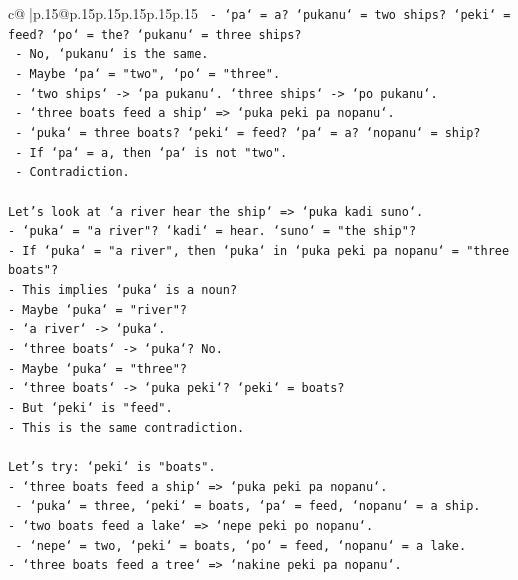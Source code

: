 \documentclass{article}
\begin{document}
{\begin{supertabular}{c@{$\;$}|p{.15\linewidth}@{}p{.15\linewidth}p{.15\linewidth}p{.15\linewidth}p{.15\linewidth}p{.15\linewidth}}
{{{\texttt{    {-} `pa` = a? `pukanu` = two ships? `peki` = feed? `po` = the? `pukanu` = three ships?} \\
\texttt{    {-} No, `pukanu` is the same.} \\
\texttt{  {-} Maybe `pa` = "two", `po` = "three".} \\
\texttt{  {-} `two ships` {-}> `pa pukanu`. `three ships` {-}> `po pukanu`.} \\
\texttt{  {-} `three boats feed a ship` => `puka peki pa nopanu`.} \\
\texttt{    {-} `puka` = three boats? `peki` = feed? `pa` = a? `nopanu` = ship?} \\
\texttt{    {-} If `pa` = a, then `pa` is not "two".} \\
\texttt{    {-} Contradiction.} \\
\\ 
\texttt{Let's look at `a river hear the ship` => `puka kadi suno`.} \\
\texttt{{-} `puka` = "a river"? `kadi` = hear. `suno` = "the ship"?} \\
\texttt{{-} If `puka` = "a river", then `puka` in `puka peki pa nopanu` = "three boats"?} \\
\texttt{{-} This implies `puka` is a noun?} \\
\texttt{{-} Maybe `puka` = "river"?} \\
\texttt{{-} `a river` {-}> `puka`.} \\
\texttt{{-} `three boats` {-}> `puka`? No.} \\
\texttt{{-} Maybe `puka` = "three"?} \\
\texttt{{-} `three boats` {-}> `puka peki`? `peki` = boats?} \\
\texttt{{-} But `peki` is "feed".} \\
\texttt{{-} This is the same contradiction.} \\
\\ 
\texttt{Let's try: `peki` is "boats".} \\
\texttt{{-} `three boats feed a ship` => `puka peki pa nopanu`.} \\
\texttt{  {-} `puka` = three, `peki` = boats, `pa` = feed, `nopanu` = a ship.} \\
\texttt{{-} `two boats feed a lake` => `nepe peki po nopanu`.} \\
\texttt{  {-} `nepe` = two, `peki` = boats, `po` = feed, `nopanu` = a lake.} \\
\texttt{{-} `three boats feed a tree` => `nakine peki pa nopanu`.} \\
}}}
\end{supertabular}}
\end{document}
